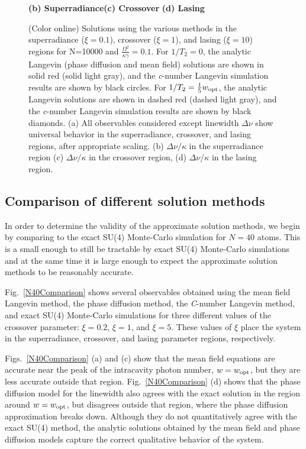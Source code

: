 \documentclass[aps,
twocolumn,
showpacs,
superscriptaddress,groupedaddress]{revtex4}
\begin{document}
\begin{figure}
\begin{center}
	\hspace{-10mm}\textbf{(b) Superradiance}\hspace{33mm}\textbf{(c) Crossover}
  \hspace{37mm}\textbf{(d) Lasing}
\end{center}
		\vspace{-5mm}
\caption{(Color online) Solutions using the various methods in the
superradiance ($\xi=0.1$), crossover ($\xi=1$), and lasing ($\xi=10$)
regions for N=10000 and $\frac{\Omega^2}{\kappa \gamma}=0.1$. For
$1/T_2=0$, the analytic Langevin (phase diffusion and mean field)
solutions are shown in solid red (solid light gray), and the
{\it c}-number Langevin simulation results are shown by black circles.
For $1/T_2=\frac{1}{5} w_{\rm opt}$, the analytic Langevin solutions are
shown in dashed red (dashed light gray), and the {\it
c}-number Langevin simulation results are shown by black diamonds. (a)
All observables considered except linewidth  $\Delta \nu$ show universal
behavior in the superradiance, crossover, and lasing regions, after
appropriate scaling.  (b)  $\Delta \nu / \kappa$ in the superradiance
region (c) $\Delta \nu / \kappa$ in the crossover region, (d) $\Delta
\nu / \kappa$ in the lasing region.}
 \label{N10000Comparison}
\end{figure}


\subsection{Comparison of different solution methods}

In order to determine the validity of the approximate solution
methods, we begin by comparing to the exact SU(4) Monte-Carlo
simulation for $N=40$ atoms. This is a small enough to still be
tractable by exact SU(4) Monte-Carlo simulations and at the same time
it is large enough to expect the approximate solution methods to be
reasonably accurate.

Fig.~\ref{N40Comparison} shows several observables obtained using the
mean field Langevin method, the phase diffusion method, the {\it
  C}-number Langevin method, and exact SU(4) Monte-Carlo simulations
for three different values of the crossover parameter: $\xi=0.2$,
$\xi=1$, and $\xi=5$. These values of $\xi$ place the system in the
superradiance, crossover, and lasing parameter regions, respectively.


Figs.~\ref{N40Comparison} (a) and (c) show that the mean field
equations are accurate near the peak of the intracavity photon number,
$w=w_{\rm opt}$, but they are less accurate outside that region.
Fig.~\ref{N40Comparison} (d) shows that the phase diffusion model for
the linewidth also agrees with the exact solution in the region around
$w=w_{\rm opt}$, but disagrees outside that region, where the phase
diffusion approximation breaks down.  Although they do not
quantitatively agree with the exact SU(4) method, the analytic
solutions obtained by the mean field and phase diffusion models
capture the correct qualitative behavior of the system.
\end{document}
